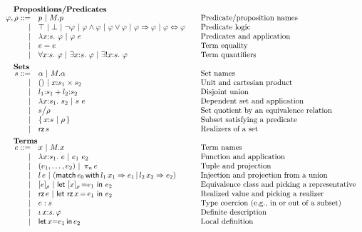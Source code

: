 \begin{figure}
	\[
	\begin{array}{rl@{\qquad}l}
		\noalign{\textbf{Propositions/Predicates}}
		\ip,\ipp ::= 
		    & \iP\ |\ \iselect{\im}{\iP}&\mbox{Predicate/proposition names}\\
		  | & \itrue \ | \ \ifalse\ |\ \inot{\ip}\ |\ \iand{\ip}{\ip}\ |\ 
		       \ior{\ip}{\ip}\ | \ \iimply{\ip}{\ip}\ |\ \iiff{\ip}{\ip} & \mbox{Predicate logic}\\
		  | & \ilambda{\ix}{\is}{\ip} \ |\ \iapp{\ip}{\ie} & \mbox{Predicates and application}\\
		  | & \iequal{\ie}{\ie} & \mbox{Term equality}\\
		  | & \iforall{\ix}{\is}{\ip} \ |\ 
		      \iexists{\ix}{\is}{\ip} \ |\
		      \iunique{\ix}{\is}{\ip} & \mbox{Term quantifiers}\\[5pt]
		
		\noalign{\textbf{Sets}}
		\is ::= 
		    & \iS \ |\ \iselect{\im}{\iS} &\mbox{Set names}\\
		  | & ()\ |\ \iprod{\ix}{\is_1}{\is_2} &\mbox{Unit and cartesian product}\\
		  | & \isum{\il_1}{\is_1}{\il_2}{\is_2} &\mbox{Disjoint union}\\
		  | & \ilambda{\ix}{\is_1}{\is_2}\ |\ 
		      \iapp{\is}{\ie} &\mbox{Dependent set and application}\\
		  | & \iquot{\is}{\ipp} & \mbox{Set quotient by an equivalence relation}\\
		  | & \isubset{\ix}{\is}{\ipp} & \mbox{Subset satisfying a predicate}\\
		  | & \irz{\is}&\mbox{Realizers of a set}\\[5pt] 
		
		\noalign{\textbf{Terms}}	
		\ie ::=
		    & \ix\ |\ \iselect{\im}{\ix} &\mbox{Term names}\\
		  | & \ilambda{\ix}{\is_1}{\ie}\ |\ 
		      \iapp{\ie_1}{\ie_2} &\mbox{Function and application}\\
		  | & \ituple{\ie_1}{\ie_2} 
		      \ibar \iproj{\ie}{n}&\mbox{Tuple and projection}\\
		  | & \iinj{\il}{\ie} 
		      \ibar (\imatch{\ie_0}{\il_1}{\ix_1}{\ie_1}{\il_2}{\ix_2}{\ie_2})&\mbox{Injection and projection from a union}\\
		  | & \ieclass{\ie}{\ipp}
		      \ibar \ileteclass{\ix}{\ipp}{\ie_1}{\ie_2}&\mbox{Equivalence class and picking a representative}\\
		  | & \irz{\ie}
		      \ibar \iletrz{\ix}{\ie_1}{\ie_2}&\mbox{Realized value and picking a realizer}\\
		  | & \iconstrain{\ie}{\is}&\mbox{Type coercion (e.g., in or out of a subset)}\\
		  | & \ithe{\ix}{\is}{\ip}&\mbox{Definite description}\\
		  | & \ilet{\ix}{\ie_1}{\ie_2}&\mbox{Local definition}\\[5pt]
		

\end{array}\]
\end{figure}
